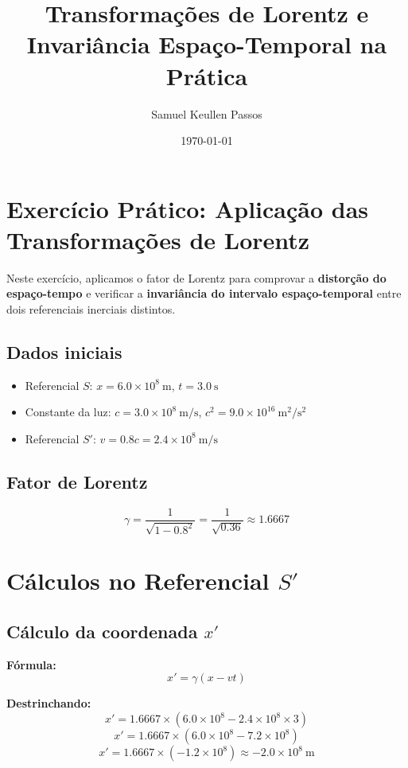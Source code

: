\documentclass[12pt,a4paper]{article}
\title{Transformações de Lorentz e Invariância Espaço-Temporal na Prática}
\author{Samuel Keullen Passos}
\date{\today}
\begin{document}
\maketitle

\section{Exercício Prático: Aplicação das Transformações de Lorentz}

Neste exercício, aplicamos o fator de Lorentz para comprovar a \textbf{distorção do espaço-tempo} e verificar a \textbf{invariância do intervalo espaço-temporal} entre dois referenciais inerciais distintos.

\subsection{Dados iniciais}

\begin{itemize}
  \item Referencial $S$: $x = 6.0\times10^{8}\ \mathrm{m}$, \quad $t = 3.0\ \mathrm{s}$
  \item Constante da luz: $c = 3.0\times10^{8}\ \mathrm{m/s}$, \quad $c^2 = 9.0\times10^{16}\ \mathrm{m^2/s^2}$
  \item Referencial $S'$: $v = 0.8c = 2.4\times10^{8}\ \mathrm{m/s}$
\end{itemize}

\subsection{Fator de Lorentz}
\[
\gamma = \frac{1}{\sqrt{1 - 0.8^2}} = \frac{1}{\sqrt{0.36}} \approx 1.6667
\]

\section{Cálculos no Referencial $S'$}

\subsection{Cálculo da coordenada $x'$}

\textbf{Fórmula:}
\[
x' = \gamma (x - v t)
\]

\textbf{Destrinchando:}
\[
x' = 1.6667 \times (6.0\times10^{8} - 2.4\times10^{8} \times 3)
\]
\[
x' = 1.6667 \times (6.0\times10^{8} - 7.2\times10^{8})
\]
\[
x' = 1.6667 \times (-1.2\times10^{8}) \approx -2.0\times10^{8}\ \mathrm{m}
\]
\end{document}
